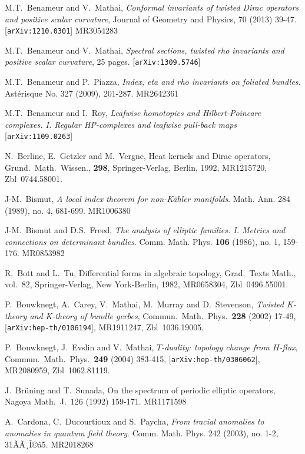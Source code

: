 \documentclass[12pt]{amsart}
\theoremstyle{plain}
\theoremstyle{definition}
\theoremstyle{remark}
\begin{document}
{\begin{thebibliography}{99}
M.T.~Benameur and V.~Mathai,
{\it Conformal invariants of twisted Dirac operators and positive scalar curvature},
Journal of Geometry and Physics, 70 (2013) 39-47. [{\tt arXiv:1210.0301}] 
MR3054283

M.T.~Benameur and V.~Mathai,
{\em Spectral sections, twisted rho invariants and positive scalar curvature}, 25 pages.
 [{\tt arXiv:1309.5746}] 

M.T.~Benameur and P.~Piazza,
{\em Index, eta and rho invariants on foliated bundles}. 
Ast\'erisque No. 327 (2009), 201-287.
MR2642361 

M.T.~Benameur and I.~Roy,
{\em Leafwise homotopies and Hilbert-Poincare complexes. I. Regular HP-complexes and leafwise pull-back maps}
 [{\tt arXiv:1109.0263}]	

N.~Berline, E.~Getzler and M.~Vergne,
Heat kernels and Dirac operators, Grund.\ Math.\ Wissen., {\bf 298},
Springer-Verlag, Berlin, 1992, MR1215720, Zbl~0744.58001.

J-M.~Bismut, 
{\em A local index theorem for non-K\"ahler manifolds}. 
Math. Ann. 284 (1989), no. 4, 681-699.
MR1006380

J-M.~Bismut and D.S.~Freed, 
{\em The analysis of elliptic families. I. Metrics and connections on determinant bundles}. 
Comm. Math. Phys. {\bf 106} (1986), no. 1, 159-176. 
MR0853982 

 
R.~Bott and L.~Tu,
Differential forms in algebraic topology,
Grad.\ Texts Math., vol.~82, Springer-Verlag, New York-Berlin, 1982,
MR0658304, Zbl~0496.55001.
 
P.~Bouwknegt, A.~Carey, V.~Mathai, M.~Murray and D.~Stevenson,
{\it Twisted K-theory and K-theory of bundle gerbes},
Commun.\ Math.\ Phys.\ {\bf 228} (2002) 17-49, [{\tt arXiv:hep-th/0106194}],
MR1911247, Zbl~1036.19005.

P.~Bouwknegt, J.~Evslin and V.~Mathai,
{\it $T$-duality: topology change from $H$-flux},
Commun.\ Math.\ Phys.\ {\bf 249} (2004) 383-415,
[{\tt arXiv:hep-th/0306062}], MR2080959, Zbl~1062.81119.

J.~Br\"uning and T.~Sunada,
On the spectrum of periodic elliptic operators,
Nagoya Math.\ J.\ 126 (1992) 159-171. 
MR1171598

A.~Cardona, C.~Ducourtioux and S.~Paycha, 
{\it From tracial anomalies to anomalies in quantum field theory}. 
Comm. Math. Phys. 242 (2003), no. 1-2, 31ÃÃ¸Î©â5.
MR2018268 


\end{thebibliography}}
\end{document}
